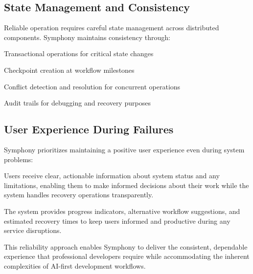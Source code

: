 \subsection*{State Management and Consistency}

Reliable operation requires careful state management across distributed components. Symphony maintains consistency through:

\begin{compactlist}
    \item Transactional operations for critical state changes
    \item Checkpoint creation at workflow milestones
    \item Conflict detection and resolution for concurrent operations
    \item Audit trails for debugging and recovery purposes
\end{compactlist}

\subsection*{User Experience During Failures}

Symphony prioritizes maintaining a positive user experience even during system problems:

\begin{alertbox}
Users receive clear, actionable information about system status and any limitations, enabling them to make informed decisions about their work while the system handles recovery operations transparently.
\end{alertbox}

The system provides progress indicators, alternative workflow suggestions, and estimated recovery times to keep users informed and productive during any service disruptions.

This  reliability approach enables Symphony to deliver the consistent, dependable experience that professional developers require while accommodating the inherent complexities of AI-first development workflows.
